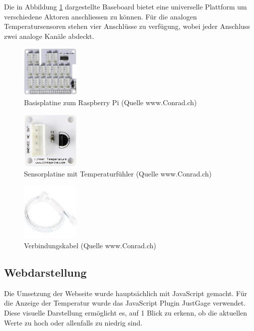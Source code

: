 Die in Abbildung \ref{fig:plate} dargestellte Baseboard bietet eine universelle Plattform um verschiedene Aktoren anschliessen zu können. Für die analogen Temperatursensoren stehen vier Anschlüsse zu verfügung, wobei jeder Anschluss zwei analoge Kanäle abdeckt. 

\begin{figure}[H]%
\centering
\includegraphics[width=0.25\textwidth]{Images/Basisplatine.jpg}
\caption{Basisplatine zum Raspberry Pi (Quelle www.Conrad.ch)}
\label{fig:plate}
\end{figure}

\begin{figure}[H]%
\centering
\includegraphics[width=0.25\textwidth]{Images/Sensorplatine.jpg}
\caption{Sensorplatine mit Temperaturfühler (Quelle www.Conrad.ch)}
\label{fig:sensor}
\end{figure}

\begin{figure}[H]%
\centering
\includegraphics[width=0.25\textwidth]{Images/Verbindungskabel.jpg}
\caption{Verbindungskabel (Quelle www.Conrad.ch)}
\label{fig:cable}
\end{figure}

\subsection{Webdarstellung}
Die Umsetzung der Webseite wurde hauptsächlich mit JavaScript gemacht.
Für die Anzeige der Temperatur wurde das JavaScript Plugin JustGage verwendet. Diese visuelle Darstellung ermöglicht es, auf 1 Blick zu erkenn, ob die aktuellen Werte zu hoch oder allenfalls zu niedrig sind.\\

